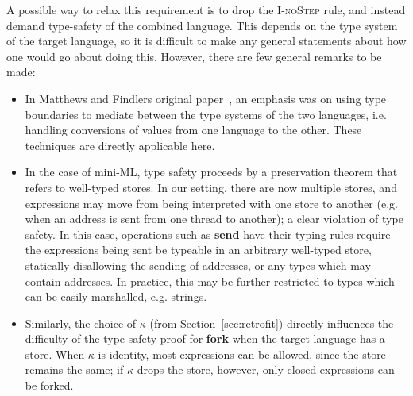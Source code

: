 A possible way to relax this requirement is to drop the \textsc{I-noStep}
rule, and instead demand type-safety of the combined language.  This
depends on the type system of the target language, so it is difficult to
make any general statements about how one would go about doing this.  However,
there are few general remarks to be made:

\begin{itemize}
    \item In Matthews and Findlers original
        paper~\cite{Matthews:2007:OSM:1190216.1190220}, an emphasis was
        on using type boundaries to mediate between the type systems of
        the two languages, i.e. handling conversions of values from
        one language to the other.  These techniques are directly applicable here.

    \item In the case of mini-ML, type safety proceeds by a preservation theorem
        that refers to well-typed stores.  In our setting, there are now multiple
        stores, and expressions may move from being interpreted with one store
        to another (e.g. when an address is sent from one thread to
        another); a clear violation of type safety.  In this case, operations
        such as \textbf{send} have their typing rules require
        the expressions being sent be typeable in an arbitrary well-typed store,
        statically disallowing the sending of addresses, or any types which
        may contain addresses.  In practice, this may be further restricted to
        types which can be easily marshalled, e.g. strings.

    \item Similarly, the choice of $\kappa$ (from Section~\ref{sec:retrofit}) directly
        influences the difficulty of the type-safety proof for
        \textbf{fork} when the target language has a store.  When
        $\kappa$ is identity, most expressions can be allowed, since the store
        remains the same; if $\kappa$ drops the store, however, only closed expressions
        can be forked.
\end{itemize}


